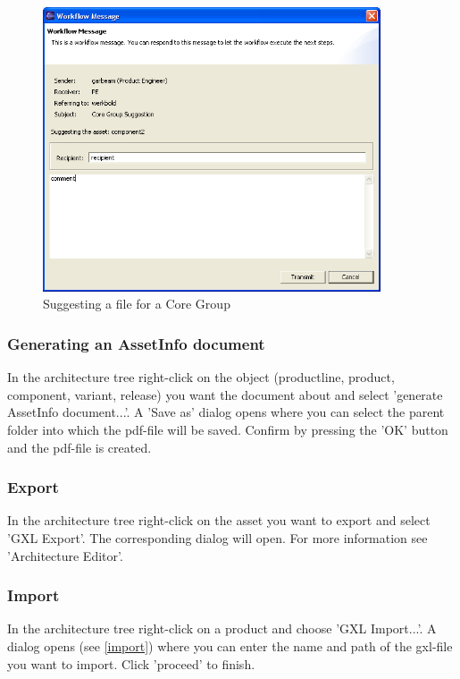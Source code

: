 \begin{figure}[h!]
\begin{center}
\includegraphics[width=10cm]{core1.png}
   \caption{Suggesting a file for a Core Group}
\label{core1}
\end{center}
\end{figure}\par


\subsubsection{Generating an AssetInfo document}
In the architecture tree right-click on the object (productline, product, component, variant, release) you want the document about
and select 'generate AssetInfo document...'. A 'Save as' dialog opens where you can select the parent folder into which the pdf-file
will be saved. Confirm by pressing the 'OK' button and the pdf-file is created.

\subsubsection{Export}
In the architecture tree right-click on the asset you want to export and select
'GXL Export'. The corresponding dialog will open. For more information see
'Architecture Editor'.

\subsubsection{Import}
In the architecture tree right-click on a product and choose 'GXL Import...'. A dialog
opens (see \ref{import}) where you can enter the name and path of the gxl-file you want to import. Click 
'proceed' to finish.

